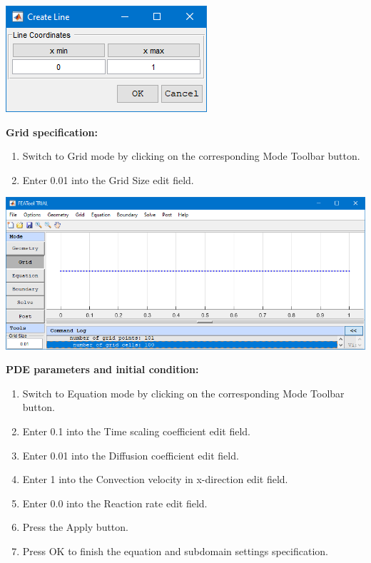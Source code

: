 \documentclass{article}
\begin{document}
\begin{center}
\includegraphics[scale=0.60]{./matlab/FEATool_steps/geometryDefinition.png}
\end{center}

\textbf{Grid specification:}
\begin{enumerate}[resume]
\item Switch to Grid mode by clicking on the corresponding Mode Toolbar button.
\item Enter  0.01  into the Grid Size edit field.
\end{enumerate}

\begin{center}
\includegraphics[scale=0.60]{./matlab/FEATool_steps/gridSpecification.png}
\end{center}

\textbf{PDE parameters and initial condition:}
\begin{enumerate}[resume]
\item Switch to Equation mode by clicking on the corresponding Mode Toolbar button.
\item Enter  0.1  into the Time scaling coefficient edit field.
\item Enter  0.01  into the Diffusion coefficient edit field.
\item Enter  1  into the Convection velocity in x-direction edit field.
\item Enter  0.0  into the Reaction rate edit field.
\item Press the Apply button.
\item Press OK to finish the equation and subdomain settings specification.
\end{enumerate}
\end{document}
